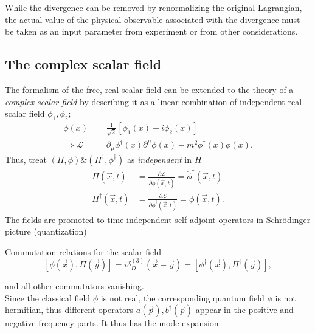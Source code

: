 \begin{enumerate}
\begin{enumerate}
	While the divergence can be removed by renormalizing the original Lagrangian, the actual value of the physical observable associated with the divergence must be taken as an input parameter from experiment or from other considerations.
\end{enumerate}
\end{enumerate}












\subsection{The complex scalar field}
The formalism of the free, real scalar field can be extended to the theory of a \emph{complex scalar field} by describing it as a linear combination of independent real scalar field $\phi_1, \phi_2$;
\begin{align}
	\phi(x) &= \frac{1}{\sqrt{2}} \left[\phi_1(x)+ i \phi_2(x)\right]\\
	\Rightarrow \mathcal{L}&= \partial_{\mu} \phi^{\dagger} (x) \partial^{\mu} \phi(x) - m^2 \phi^{\dagger}(x) \phi(x).
\end{align}
Thus, treat $(\Pi,\phi) \& (\Pi^{\dagger}, \phi^{\dagger})$ as \emph{independent} in $H$
\begin{align}
	\Pi(\vec{x},t) &= \frac{\partial \mathcal{L}}{\partial \dot{\phi} (\vec{x},t)} = \dot{\phi}^{\dagger}(\vec{x},t) \\
	\Pi^{\dagger}(\vec{x},t) &= \frac{\partial \mathcal{L}}{\partial \dot{\phi}^{\dagger} (\vec{x},t)} = \dot{\phi}(\vec{x},t).
\end{align}
The fields are promoted to time-independent self-adjoint operators in Schrödinger picture (quantization)
\begin{mybox}{Commutation relations for the scalar field}
	\begin{equation}
	\left[\phi(\vec{x}), \Pi (\vec{y})\right] = i \delta^{(3)}_D(\vec{x}-\vec{y})= \left[\phi^{\dagger}(\vec{x}),\Pi^{\dagger}(\vec{y})\right],
	\end{equation}
\end{mybox}
and all other commutators vanishing.\\
Since the classical field $\phi$ is not real, the corresponding quantum field $\phi$ is not hermitian, thus different operators $a(\vec{p}),b^{\dagger}(\vec{p})$ appear in the positive and negative frequency parts. It thus has the mode expansion:
